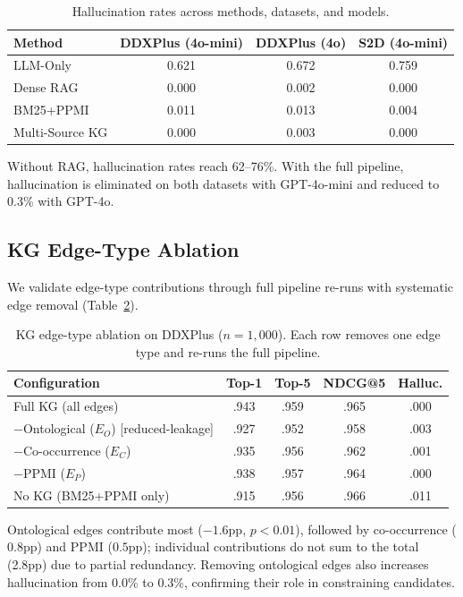 \documentclass[runningheads]{llncs}
\begin{document}
\begin{table}[t]
\centering
\caption{Hallucination rates across methods, datasets, and models.}
\label{tab:halluc}
\begin{tabular}{lccc}
\toprule
\textbf{Method} & \textbf{DDXPlus (4o-mini)} & \textbf{DDXPlus (4o)} & \textbf{S2D (4o-mini)} \\
\midrule
LLM-Only        & 0.621 & 0.672 & 0.759 \\
Dense RAG        & 0.000 & 0.002 & 0.000 \\
BM25+PPMI        & 0.011 & 0.013 & 0.004 \\
Multi-Source KG  & 0.000 & 0.003 & 0.000 \\
\bottomrule
\end{tabular}
\end{table}

Without RAG, hallucination rates reach 62--76\%. With the full pipeline, hallucination is eliminated on both datasets with GPT-4o-mini and reduced to 0.3\% with GPT-4o.

\subsection{KG Edge-Type Ablation}
\label{sec:edge_ablation}

We validate edge-type contributions through full pipeline re-runs with systematic edge removal (Table~\ref{tab:edge_ablation}).

\begin{table}[t]
\centering
\caption{KG edge-type ablation on DDXPlus ($n{=}1{,}000$). Each row removes one edge type and re-runs the full pipeline.}
\label{tab:edge_ablation}
\begin{tabular}{lcccc}
\toprule
\textbf{Configuration} & \textbf{Top-1} & \textbf{Top-5} & \textbf{NDCG@5} & \textbf{Halluc.} \\
\midrule
Full KG (all edges)      & .943 & .959 & .965 & .000 \\
$-$Ontological ($E_O$) [reduced-leakage]  & .927 & .952 & .958 & .003 \\
$-$Co-occurrence ($E_C$) & .935 & .956 & .962 & .001 \\
$-$PPMI ($E_P$)          & .938 & .957 & .964 & .000 \\
No KG (BM25+PPMI only)   & .915 & .956 & .966 & .011 \\
\bottomrule
\end{tabular}
\end{table}

Ontological edges contribute most ($-1.6$pp, $p < 0.01$), followed by co-occurrence ($0.8$pp) and PPMI ($0.5$pp); individual contributions do not sum to the total (2.8pp) due to partial redundancy. Removing ontological edges also increases hallucination from 0.0\% to 0.3\%, confirming their role in constraining candidates.
\end{document}
